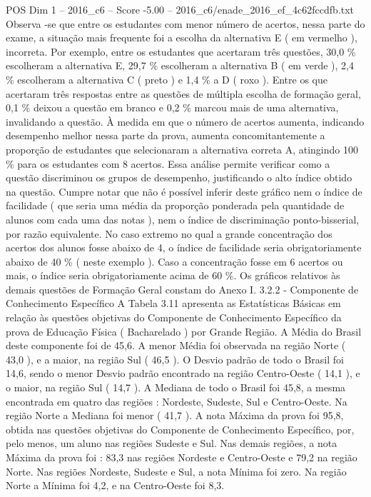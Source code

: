 \begin{textsample}{POS Dim 1 – 2016\_c6 – Score -5.00 – 2016\_c6/enade\_2016\_ef\_4c62fccdfb.txt}
Observa -se que entre os estudantes com menor número de acertos, nessa parte do exame, a situação mais frequente foi a escolha da alternativa E ( em vermelho ), incorreta.
Por exemplo, entre os estudantes que acertaram três questões, 30,0 \% escolheram a alternativa E, 29,7 \% escolheram a alternativa B ( em verde ), 2,4 \% escolheram a alternativa C ( preto ) e 1,4 \% a D ( roxo ).
Entre os que acertaram três respostas entre as questões de múltipla escolha de formação geral, 0,1 \% deixou a questão em branco e 0,2 \% marcou mais de uma alternativa, invalidando a questão.
À medida em que o número de acertos aumenta, indicando desempenho melhor nessa parte da prova, aumenta concomitantemente a proporção de estudantes que selecionaram a alternativa correta A, atingindo 100 \% para os estudantes com 8 acertos.
Essa análise permite verificar como a questão discriminou os grupos de desempenho, justificando o alto índice obtido na questão.
Cumpre notar que não é possível inferir deste gráfico nem o índice de facilidade ( que seria uma média da proporção ponderada pela quantidade de alunos com cada uma das notas ), nem o índice de discriminação ponto-bisserial, por razão equivalente.
No caso extremo no qual a grande concentração dos acertos dos alunos fosse abaixo de 4, o índice de facilidade seria obrigatoriamente abaixo de 40 \% ( neste exemplo ).
Caso a concentração fosse em 6 acertos ou mais, o índice seria obrigatoriamente acima de 60 \%.
Os gráficos relativos às demais questões de Formação Geral constam do Anexo I. 3.2.2 - Componente de Conhecimento Específico A Tabela 3.11 apresenta as Estatísticas Básicas em relação às questões objetivas do Componente de Conhecimento Específico da prova de Educação Física ( Bacharelado ) por Grande Região.
A Média do Brasil deste componente foi de 45,6.
A menor Média foi observada na região Norte ( 43,0 ), e a maior, na região Sul ( 46,5 ).
O Desvio padrão de todo o Brasil foi 14,6, sendo o menor Desvio padrão encontrado na região Centro-Oeste ( 14,1 ), e o maior, na região Sul ( 14,7 ).
A Mediana de todo o Brasil foi 45,8, a mesma encontrada em quatro das regiões : Nordeste, Sudeste, Sul e Centro-Oeste.
Na região Norte a Mediana foi menor ( 41,7 ).
A nota Máxima da prova foi 95,8, obtida nas questões objetivas do Componente de Conhecimento Específico, por, pelo menos, um aluno nas regiões Sudeste e Sul.
Nas demais regiões, a nota Máxima da prova foi : 83,3 nas regiões Nordeste e Centro-Oeste e 79,2 na região Norte.
Nas regiões Nordeste, Sudeste e Sul, a nota Mínima foi zero.
Na região Norte a Mínima foi 4,2, e na Centro-Oeste foi 8,3.

\end{textsample}
